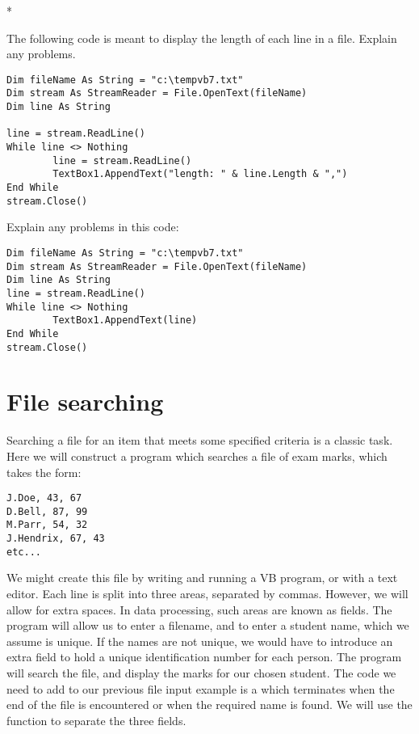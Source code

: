 		\begin{stqb}*
			\begin{STQ}
				\item	The following code is meant to display the length of each line in a file. Explain any problems.
					\begin{lstlisting}
Dim fileName As String = "c:\tempvb7.txt"
Dim stream As StreamReader = File.OpenText(fileName)
Dim line As String
	
line = stream.ReadLine()
While line <> Nothing
		line = stream.ReadLine()
		TextBox1.AppendText("length: " & line.Length & ",")
End While
stream.Close()
					\end{lstlisting}
				\item	Explain any problems in this code:
					\begin{lstlisting}
Dim fileName As String = "c:\tempvb7.txt"
Dim stream As StreamReader = File.OpenText(fileName)
Dim line As String
line = stream.ReadLine()
While line <> Nothing
		TextBox1.AppendText(line)
End While
stream.Close()
					\end{lstlisting}
			\end{STQ}
		\end{stqb}


	\section{File searching}
		Searching a file for an item that meets some specified criteria is a classic task. Here we will construct a program which searches a file of exam marks, which takes the form:
		\begin{lstlisting}
J.Doe, 43, 67
D.Bell, 87, 99
M.Parr, 54, 32
J.Hendrix, 67, 43
etc...
		\end{lstlisting}
		We might create this file by writing and running a VB program, or with a text editor. Each line is split into three areas, separated by commas. However, we will allow for extra spaces. In data processing, such areas are known as fields. The program will allow us to enter a filename, and to enter a student name, which we assume is unique. If the names are not unique, we would have to introduce an extra field to hold a unique identification number for each person. The program will search the file, and display the marks for our chosen student. The code we need to add to our previous file input example is a  which terminates when the end of the file is encountered or when the required name is found. We will use the  function to separate the three fields.
		
